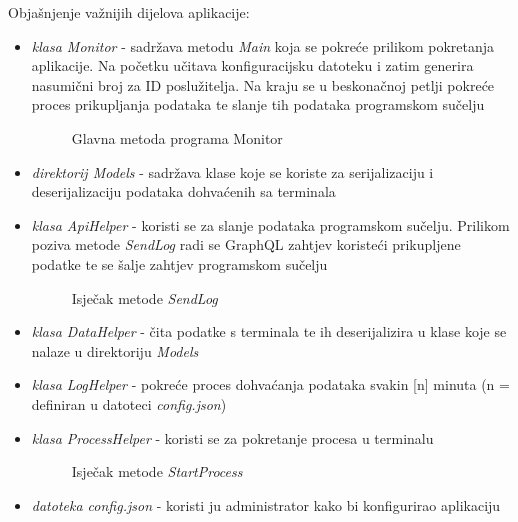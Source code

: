\documentclass[zavrsnirad]{fer}
\begin{document}
Objašnjenje važnijih dijelova aplikacije:
\begin{itemize}
	\item \textit{klasa Monitor} - sadržava metodu \textit{Main} koja se pokreće prilikom pokretanja aplikacije. Na početku učitava konfiguracijsku datoteku i zatim generira nasumični broj za ID poslužitelja. Na kraju se u beskonačnoj petlji pokreće proces prikupljanja podataka te slanje tih podataka programskom sučelju
	\begin{figure}[htb]
		\centering
		
		\caption{Glavna metoda programa Monitor}
	\end{figure}
	\FloatBarrier	
	\item \textit{direktorij Models} - sadržava klase koje se koriste za serijalizaciju i deserijalizaciju podataka dohvaćenih sa terminala
	\item \textit{klasa ApiHelper} - koristi se za slanje podataka programskom sučelju. Prilikom poziva metode \textit{SendLog} radi se GraphQL zahtjev koristeći prikupljene podatke te se šalje zahtjev programskom sučelju
	\begin{figure}[htb]
		\centering
		
		\caption{Isječak metode \textit{SendLog}}
	\end{figure}
	\FloatBarrier		
	\item \textit{klasa DataHelper} - čita podatke s terminala te ih deserijalizira u klase koje se nalaze u direktoriju \textit{Models}
	\item \textit{klasa LogHelper} - pokreće proces dohvaćanja podataka svakin [n] minuta (n = definiran u datoteci \textit{config.json})
	\item \textit{klasa ProcessHelper} - koristi se za pokretanje procesa u terminalu
	\begin{figure}[htb]
		\centering
		
		\caption{Isječak metode \textit{StartProcess}}
	\end{figure}	
	\item \textit{datoteka config.json} - koristi ju administrator kako bi konfigurirao aplikaciju
\end{itemize}
\end{document}

